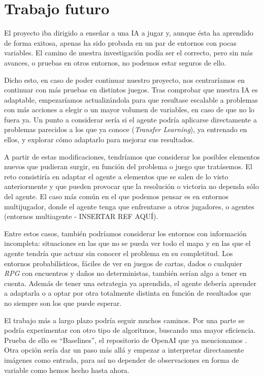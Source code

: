 \section{Trabajo futuro}

El proyecto iba dirigido a enseñar a una IA a jugar y, aunque ésta ha aprendido de forma exitosa, apenas ha sido probada en un par de entornos con pocas variables. El camino de nuestra investigación podía ser el correcto, pero sin más avances, o pruebas en otros entornos, no podemos estar seguros de ello. 

Dicho esto, en caso de poder continuar nuestro proyecto, nos centraríamos en continuar con más pruebas en distintos juegos. Tras comprobar que nuestra IA es adaptable, empezaríamos actualizándola para que resultase escalable a problemas con más acciones a elegir o un mayor volumen de variables, en caso de que no lo fuera ya. Un punto a considerar sería si el agente podría aplicarse directamente a problemas parecidos a los que ya conoce (\textit{Transfer Learning}), ya entrenado en ellos, y explorar cómo adaptarlo para mejorar sus resultados.

A partir de estas modificaciones, tendríamos que considerar los posibles elementos nuevos que pudieran surgir, en función del problema o juego que tratásemos. El reto consistiría en adaptar el agente a elementos que se salen de lo visto anteriormente y que pueden provocar que la resolución o victoria no dependa sólo del agente. El caso más común en el que podemos pensar es en entornos multijugador, donde el agente tenga que enfrentarse a otros jugadores, o agentes (entornos multiagente - INSERTAR REF AQUÍ). 

Entre estos casos, también podríamos considerar los entornos con información incompleta: situaciones en las que no se pueda ver todo el mapa y en las que el agente tendría que actuar sin conocer el problema en su completitud. Los entornos probabilísticos, fáciles de ver en juegos de cartas, dados o cualquier \textit{RPG} con encuentros y daños no deterministas, también serían algo a tener en cuenta. Además de tener una estrategia ya aprendida, el agente debería aprender a adaptarla o a optar por otra totalmente distinta en función de resultados que no siempre son los que puede esperar. 

El trabajo más a largo plazo podría seguir muchos caminos. Por una parte se podría experimentar con otro tipo de algoritmos, buscando una mayor eficiencia. Prueba de ello es ``Baselines'', el repositorio de OpenAI que ya mencionamos \citep{baselines}. Otra opción sería dar un paso más allá y empezar a interpretar directamente imágenes como entrada, para así no depender de observaciones en forma de variable como hemos hecho hasta ahora.

